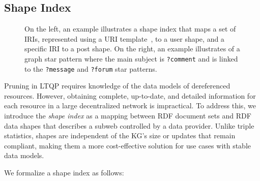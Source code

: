 \subsection{Shape Index}

\begin{figure}
   \centering
   \begin{minipage}[t]{0.50\linewidth}
      \centering
      
   \end{minipage}
   \begin{minipage}[t]{0.45\linewidth}
      \centering
      
   \end{minipage}

   \caption{
      On the left, an example illustrates a shape index that maps a set of IRIs, represented using a URI template~\cite{ietf6570Template}, to a user shape, and a specific IRI to a post shape.
      On the right, an example illustrates of a graph star pattern where the main subject is \texttt{?comment} and is linked to the \texttt{?message} and \texttt{?forum} star patterns.}
   \label{fig:shapeIndex}
\end{figure}

Pruning in LTQP requires knowledge of the data models of dereferenced resources.  
However, obtaining complete, up-to-date, and detailed information for each resource in a large decentralized network is impractical.  
To address this, we introduce the \emph{shape index} as a mapping between RDF document sets and RDF data shapes that describes a subweb controlled by a data provider.  
Unlike triple statistics, shapes are independent of the KG's size or updates that remain compliant, making them a more cost-effective solution for use cases with stable data models. 

We formalize a shape index as follows:

